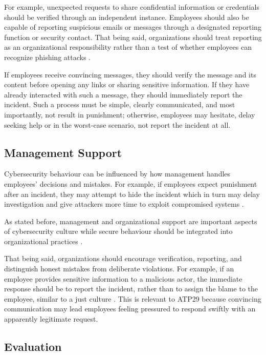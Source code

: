 For example, unexpected requests to share confidential information or credentials should be verified through an independent instance. Employees should also be capable of reporting suspicious emails or messages through a designated reporting function or security contact. That being said, organizations should treat reporting as an organizational responsibility rather than a test of whether employees can recognize phishing attacks \parencite{Petri2025}. 

If employees receive convincing messages, they should verify the message and its content before opening any links or sharing sensitive information. If they have already interacted with such a message, they should immediately report the incident. Such a process must be simple, clearly communicated, and most importantly, not result in punishment; otherwise, employees may hesitate, delay seeking help or in the worst-case scenario, not report the incident at all. 

\subsection{Management Support}

Cybersecurity behaviour can be influenced by how management handles employees' decisions and mistakes. For example, if employees expect punishment after an incident, they may attempt to hide the incident which in turn may delay investigation and give attackers more time to exploit compromised systems \parencite{Patterson2024}. 

As stated before, management and organizational support are important aspects of cybersecurity culture while secure behaviour should be integrated into organizational practices \parencite{Sutton2025, europeanSecurity.2018}. 

That being said, organizations should encourage verification, reporting, and distinguish honest mistakes from deliberate violations. For example, if an employee provides sensitive information to a malicious actor, the immediate response should be to report the incident, rather than to assign the blame to the employee, similar to a just culture \parencite{dekker2016just}. This is relevant to ATP29 because convincing communication may lead employees feeling pressured to respond swiftly with an apparently legitimate request.

\subsection{Evaluation}


